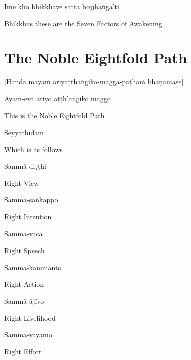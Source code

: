 Ime kho bhikkhave satta bojjhaṅgā’ti

\begin{english}
  Bhikkhus these are the Seven Factors of Awakening
\end{english}

\suttaRef{[SN 46.22]}


\section{The Noble Eightfold Path}
\label{noble-eightfold-path}

\begin{center}
  [Handa mayaṁ ariyaṭṭhaṅgika-magga-pāṭhaṁ bhaṇāmase]
\end{center}

Ayam-eva ariyo aṭṭh'aṅgiko maggo

\begin{english}
  This is the Noble Eightfold Path
\end{english}

Seyyathīdaṁ

\begin{english}
  Which is as follows
\end{english}

Sammā-diṭṭhi

\begin{english}
  Right View
\end{english}

Sammā-saṅkappo

\begin{english}
  Right Intention
\end{english}

Sammā-vācā

\begin{english}
  Right Speech
\end{english}

Sammā-kammanto

\begin{english}
  Right Action
\end{english}

Sammā-ājīvo

\begin{english}
  Right Livelihood
\end{english}

Sammā-vāyāmo

\begin{english}
  Right Effort
\end{english}

